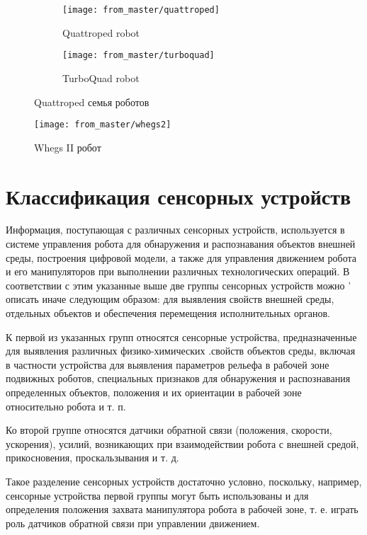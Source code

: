     
    \begin{figure}[H]
    \begin{subfigure}{0.49\textwidth}
    \centering\texttt{[image: from\_master/quattroped]}\\
    \caption{Quattroped robot}
    \label{fig:quattroped}
    \end{subfigure}
    \begin{subfigure}{0.49\textwidth}
    \centering\texttt{[image: from\_master/turboquad]}\\
    \caption{TurboQuad robot}
    \label{fig:turboquad}
    \end{subfigure}
    \caption{Quattroped семья роботов}
    \label{quatro}
    \end{figure}
    
    \begin{figure}[H]
    \centering\texttt{[image: from\_master/whegs2]}\\
    \caption{Whegs II робот}
    \label{fig:whegs}
    \end{figure}

\section{Классификация сенсорных устройств}
Информация, поступающая с различных сенсорных устройств, используется в системе управления робота для обнаружения и распознавания объектов внешней среды, построения цифровой модели, а также для управления движением робота и его манипуляторов при выполнении различных технологических операций. В соответствии с этим указанные выше две группы сенсорных устройств можно ' описать иначе следующим образом: для выявления свойств внешней среды, отдельных объектов и обеспечения перемещения исполнительных органов.

К первой из указанных групп относятся сенсорные устройства, предназначенные для выявления различных физико-химических .свойств объектов среды, включая в частности устройства для выявления параметров рельефа в рабочей зоне подвижных роботов, специальных признаков для обнаружения и распознавания определенных объектов, положения и их ориентации в рабочей зоне относительно робота и т. п.

Ко второй группе относятся датчики обратной связи (положения, скорости, ускорения), усилий, возникающих при взаимодействии робота с внешней средой, прикосновения, проскальзывания и т. д.

Такое разделение сенсорных устройств достаточно условно, поскольку, например, сенсорные устройства первой группы могут быть использованы и для определения положения захвата манипулятора робота в рабочей зоне, т. е. играть роль датчиков обратной связи при управлении движением.

